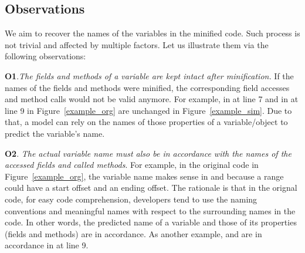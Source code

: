 \subsection{Observations}



We aim to recover the names of the variables in the minified
code. Such process is not trivial and affected by multiple factors.
Let us illustrate them via the following observations:






\textbf{O1}.{\em The fields and methods of a variable are kept intact
  after minification.} If the names of the fields and methods were
minified, the corresponding field accesses and method calls would not
be valid anymore. For example,  in
 at line 7 and  in
 at line 9 in Figure~\ref{example_org} are
unchanged in Figure~\ref{example_sim}. Due to that, a model can rely
on the names of those properties of a variable/object to predict the
variable's name.

\textbf{O2}. {\em The actual variable name must also be in accordance
  with the names of the accessed fields and called methods}. For
example, in the original code in Figure~\ref{example_org}, the
variable name  makes sense in  and
 because a range could have a start offset and
an ending offset. The rationale is that in the orignal code, for easy
code comprehension, developers tend to use the naming conventions and
meaningful names with respect to the surrounding names in the code. In
other words, the predicted name of a variable and those of its
properties (fields and methods) are in accordance. As another example,
 and  are in accordance in
 at line 9.

